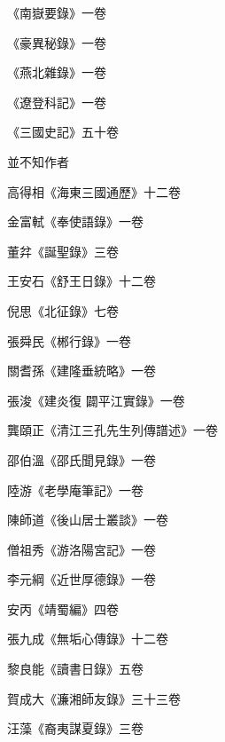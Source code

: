 \begin{pinyinscope}
 《南嶽要錄》一卷



 《豪異秘錄》一卷



 《燕北雜錄》一卷



 《遼登科記》一卷



 《三國史記》五十卷



 並不知作者



 高得相《海東三國通歷》十二卷



 金富軾《奉使語錄》一卷



 董弅《誕聖錄》三卷



 王安石《舒王日錄》十二卷



 倪思《北征錄》七卷



 張舜民《郴行錄》一卷



 關耆孫《建隆垂統略》一卷



 張浚《建炎復
 闢平江實錄》一卷



 龔頤正《清江三孔先生列傳譜述》一卷



 邵伯溫《邵氏聞見錄》一卷



 陸游《老學庵筆記》一卷



 陳師道《後山居士叢談》一卷



 僧祖秀《游洛陽宮記》一卷



 李元綱《近世厚德錄》一卷



 安丙《靖蜀編》四卷



 張九成《無垢心傳錄》十二卷



 黎良能《讀書日錄》五卷



 賀成大《濂湘師友錄》三十三卷



 汪藻《裔夷謀夏錄》三卷




\end{pinyinscope}
